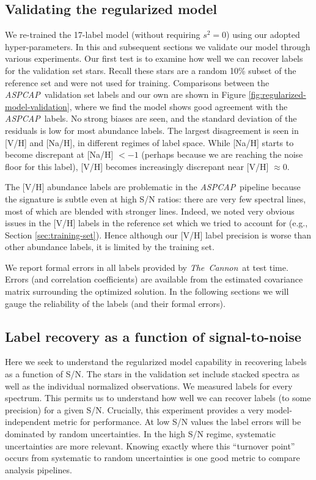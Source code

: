 \documentclass[12pt,preprint]{aastex}
\newcommand{\project}[1]{\textsl{#1}}
\newcommand{\TheCannon}{\project{The~Cannon}}
\newcommand{\acronym}[1]{{\small{#1}}}
\newcommand{\aspcap}{\project{\acronym{ASPCAP}}}
\begin{document}
\subsection{Validating the regularized model}
\label{sec:model-validation}


We re-trained the 17-label model (without requiring $s^2 = 0$) using our adopted
hyper-parameters.  In this and subsequent sections we validate our model through
various experiments.  Our first test is to examine how well we can recover
labels for the validation set stars.  Recall these stars are a random 10\%
subset of the reference set and were not used for training.  Comparisons between
the \aspcap\ validation set labels and our own are shown in Figure
\ref{fig:regularized-model-validation}, where we find the model shows good
agreement with the \aspcap\ labels.  No strong biases are seen, and the standard
deviation of the residuals is low for most abundance labels.  The largest
disagreement is seen in [V/H] and [Na/H], in different regimes of label space.
While [Na/H] starts to become discrepant at [Na/H] $< -1$ (perhaps because we
are reaching the noise floor for this label), [V/H] becomes increasingly discrepant
near [V/H] $\approx 0$. 


The [V/H] abundance labels are problematic in the \aspcap\ pipeline 
because the signature is subtle even at high S/N ratios: there are very few
spectral lines, most of which are blended with stronger lines.  Indeed, we noted
very obvious issues in the [V/H] labels in the reference set which we tried to
account for (e.g., Section \ref{sec:training-set}).  Hence although our [V/H]
label precision is worse than other abundance labels, it is limited by the
training set.


We report formal errors in all labels provided by \TheCannon\ at test time.
Errors (and correlation coefficients) are available from the estimated
covariance matrix surrounding the optimized solution.  In the following sections
we will gauge the reliability of the labels (and their formal errors).


\subsection{Label recovery as a function of signal-to-noise}
\label{sec:label-recovery-snr}


Here we seek to understand the
regularized model capability in recovering labels as a function of S/N.  The 
stars in the validation set include stacked spectra as well as the individual 
normalized observations.  We measured labels for every spectrum.  This permits us
to understand how well we can recover labels (to some precision) for a given 
S/N.  Crucially, this experiment provides a very model-independent metric for
performance.  At low S/N values the label errors will be dominated by random
uncertainties.  In the high S/N regime, systematic uncertainties are more 
relevant.  Knowing exactly where this ``turnover point'' occurs from systematic
to random uncertainties is one good metric to compare analysis pipelines.
\end{document}
